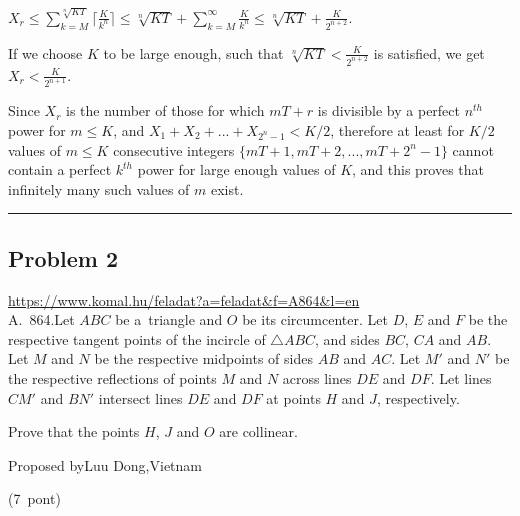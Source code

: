 \documentclass{article}
\begin{document}
\(\displaystyle X_r\le \sum_{k=M}^{\sqrt[n]{KT}} \lceil \frac{K}{k^n} \rceil\le \sqrt[n]{KT}+\sum_{k=M}^{\infty} \frac{K}{k^n} \le \sqrt[n]{KT}+\frac{K}{2^{n+2}}.\)

If we choose \(\displaystyle K\) to be large enough, such that \(\displaystyle \sqrt[n]{KT}<\frac{K}{2^{n+2}}\) is satisfied, we get \(\displaystyle X_r<\frac{K}{2^{n+1}}\).

Since \(\displaystyle X_r\) is the number of those for which \(\displaystyle mT+r\) is divisible by a perfect \(\displaystyle n^{th}\) power for \(\displaystyle m\le K\), and \(\displaystyle X_1+X_2+...+X_{2^n-1}<K/2\), therefore at least for \(\displaystyle K/2\) values of \(\displaystyle m\le K\) consecutive integers \(\displaystyle \{mT+1,mT+2,...,mT+2^n-1\}\) cannot contain a perfect \(\displaystyle k^{th}\) power for large enough values of \(\displaystyle K\), and this proves that infinitely many such values of \(\displaystyle m\) exist.

\vspace{1em}
\hrule
\vspace{1em}

\subsection*{Problem 2}
\noindent\url{https://www.komal.hu/feladat?a=feladat&f=A864&l=en}\\[1em]

A. 864.Let \(\displaystyle ABC\) be a triangle and \(\displaystyle O\) be its circumcenter. Let \(\displaystyle D\), \(\displaystyle E\) and \(\displaystyle F\) be the respective tangent points of the incircle of \(\displaystyle \triangle ABC\), and sides \(\displaystyle BC\), \(\displaystyle CA\) and \(\displaystyle AB\). Let \(\displaystyle M\) and \(\displaystyle N\) be the respective midpoints of sides \(\displaystyle AB\) and \(\displaystyle AC\). Let \(\displaystyle M'\) and \(\displaystyle N'\) be the respective reflections of points \(\displaystyle M\) and \(\displaystyle N\) across lines \(\displaystyle DE\) and \(\displaystyle DF\). Let lines \(\displaystyle CM'\) and \(\displaystyle BN'\) intersect lines \(\displaystyle DE\) and \(\displaystyle DF\) at points \(\displaystyle H\) and \(\displaystyle J\), respectively.

Prove that the points \(\displaystyle H\), \(\displaystyle J\) and \(\displaystyle O\) are collinear.

Proposed byLuu Dong,Vietnam

(7 pont)
\end{document}
